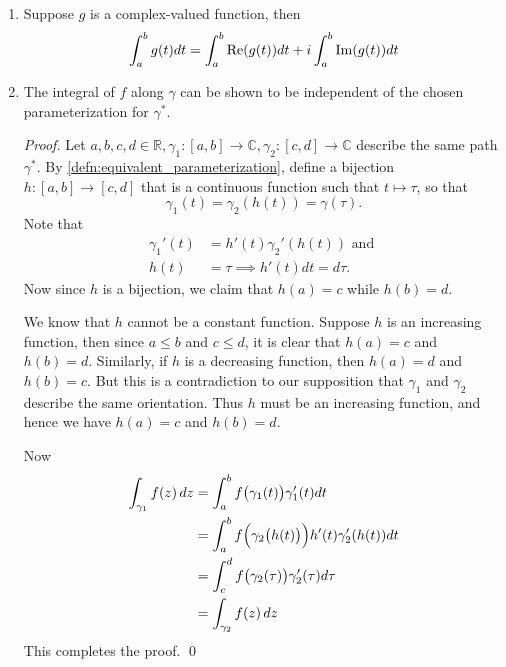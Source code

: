\documentclass[11pt, oneside]{book}
\begin{document}
\begin{remark}
	\begin{enumerate}
		\item Suppose $g$ is a complex-valued function, then
			\begin{equation*}
				\int_{a}^{b} g(t) dt = \int_{a}^{b} \operatorname{Re}(g(t)) dt + i \int_{a}^{b} \operatorname{Im}(g(t)) dt
			\end{equation*}\label{remark:integral_into_real_and_imaginary_parts}
		\item The integral of $f$ along $\gamma$ can be shown to be independent of the chosen parameterization for $\gamma^*$.

		\begin{proof}
			Let $a, b, c, d \in \mathbb{R}, \gamma_1 : [a, b] \to \mathbb{C}, \gamma_2 : [c, d] \to \mathbb{C}$ describe the same path $\gamma^*$. By \cref{defn:equivalent_parameterization}, define a bijection $h : [a, b] \to [c, d]$ that is a continuous function such that $t \mapsto \tau$, so that
			\begin{equation*}
				\gamma_1(t) = \gamma_2(h(t)) = \gamma(\tau).
			\end{equation*}
			Note that
			\begin{align*}
				\gamma_1'(t) &= h'(t)\gamma_2'(h(t)) \text{ and } \\
				h(t) &= \tau \implies h'(t) dt = d\tau.
			\end{align*}
			Now since $h$ is a bijection, we claim that $h(a) = c$ while $h(b) = d$.

			We know that $h$ cannot be a constant function. Suppose $h$ is an increasing function, then since $a \leq b$ and $c \leq d$, it is clear that $h(a) = c$ and $h(b) = d$. Similarly, if $h$ is a decreasing function, then $h(a) = d$ and $h(b) = c$. But this is a contradiction to our supposition that $\gamma_1$ and $\gamma_2$ describe the same orientation. Thus $h$ must be an increasing function, and hence we have $h(a) = c$ and $h(b) = d$.


			Now
			\begin{align*}
				\int_{\gamma_1} f(z) \mathop{}\!d{z}
					&= \int_{a}^{b} f\big( \gamma_1(t) \big) \gamma_1'(t) dt \\
					&= \int_{a}^{b} f\Big( \gamma_2 \big( h(t) \big) \Big) h'(t) \gamma_2'(h(t)) dt \\
					&= \int_{c}^{d} f\big( \gamma_2(\tau) \big) \gamma_2'(\tau) d\tau \\
					&= \int_{\gamma_2} f(z) \mathop{}\!d{z}
			\end{align*}
			This completes the proof. \qed
		\end{proof}
	\end{enumerate}
\end{remark}
\end{document}
